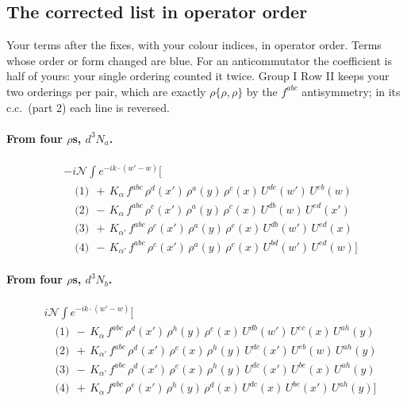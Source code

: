 \documentclass[10pt]{article}
\numberwithin{equation}{section}
\newcommand{\NN}{\mathcal N}
\begin{document}
\subsection{The corrected list in operator order}\label{sec:oplist}
Your terms after the fixes, with your colour indices, in operator order. Terms whose order or form changed are blue. For an anticommutator the coefficient is half of yours: your single ordering counted it twice. Group I Row II keeps your two orderings per pair, which are exactly $\rho\{\rho,\rho\}$ by the $f^{abc}$ antisymmetry; in its c.c.\ (part 2) each line is reversed.
\paragraph{From four $\rho$\textquotesingle s, $d^3N_a$.}
\begin{align*}
&-i\NN\int e^{-ik\cdot(w'-w)}\Big[\\
&\quad\text{(1)}\ \ +\,K_{\alpha}\,f^{abc}\,\rho^{d}(x')\,\rho^{a}(y)\,\rho^{c}(x)\,U^{de}(w')\,U^{eb}(w)\\
&\quad\text{(2)}\ \ -\,K_{\alpha}\,f^{abc}\,\rho^{e}(x')\,\rho^{a}(y)\,\rho^{c}(x)\,U^{db}(w)\,U^{ed}(x')\\
&\quad\text{(3)}\ \ +\,K_{\alpha'}\,f^{abc}\,\rho^{c}(x')\,\rho^{a}(y)\,\rho^{e}(x)\,U^{db}(w')\,U^{ed}(x)\\
&\quad\text{(4)}\ \ -\,K_{\alpha'}\,f^{abc}\,\rho^{c}(x')\,\rho^{a}(y)\,\rho^{e}(x)\,U^{bd}(w')\,U^{ed}(w)\Big]
\end{align*}
\paragraph{From four $\rho$\textquotesingle s, $d^3N_b$.}
\begin{align*}
&i\NN\int e^{-ik\cdot(w'-w)}\Big[\\
&\quad\text{(1)}\ \ -\,K_{\alpha}\,f^{abc}\,\rho^{d}(x')\,\rho^{h}(y)\,\rho^{e}(x)\,U^{db}(w')\,U^{ec}(x)\,U^{ah}(y)\\
&\quad\text{(2)}\ \ +\,K_{\alpha'}\,f^{abc}\,\rho^{d}(x')\,\rho^{e}(x)\,\rho^{h}(y)\,U^{dc}(x')\,U^{eb}(w)\,U^{ah}(y)\\
&\quad\text{(3)}\ \ -\,K_{\alpha'}\,f^{abc}\,\rho^{d}(x')\,\rho^{e}(x)\,\rho^{h}(y)\,U^{dc}(x')\,U^{be}(x)\,U^{ah}(y)\\
&\quad\text{(4)}\ \ +\,K_{\alpha}\,f^{abc}\,\rho^{e}(x')\,\rho^{h}(y)\,\rho^{d}(x)\,U^{dc}(x)\,U^{be}(x')\,U^{ah}(y)\Big]
\end{align*}
\end{document}
